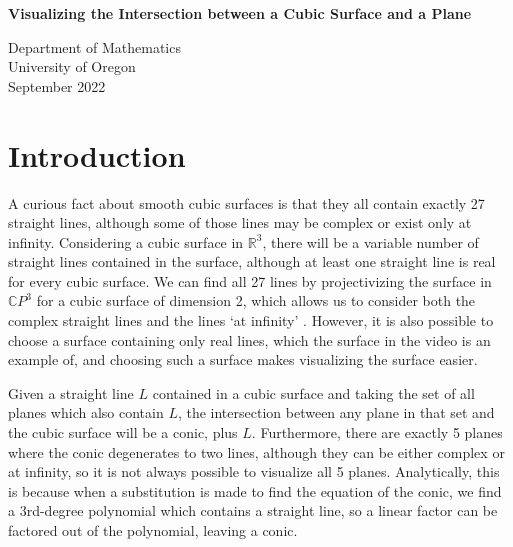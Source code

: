 \documentclass{article}
\newcommand{\C}{{\mathbb C}}
\newcommand{\R}{{\mathbb R}}
\begin{document}
\iftrue
\begin{titlepage}
    \begin{center}
        \vspace*{1cm}
            
        \Huge
        \textbf{Visualizing the Intersection between a Cubic Surface and a Plane}
            
        \vspace{0.5cm}
        \LARGE
            
        \vspace{1.5cm}
            
        
        \vspace{1.5cm}
        
        \large

            
        \vfill  
            
        \vspace{0.8cm}
            
        \Large
        Department of Mathematics\\
        University of Oregon\\
        September 2022
            
    \end{center}
\end{titlepage}
\fi

\section*{Introduction}
   
	
	A curious fact about smooth cubic surfaces is that they all contain exactly 27 straight lines, although some of those lines may be complex or exist only at infinity. Considering a cubic surface in $\R^3$, there will be a variable number of straight lines contained in the surface, although at least one straight line is real for every cubic surface. We can find all 27 lines by projectivizing the surface in $\C P^3$ for a cubic surface of dimension 2, which allows us to consider both the complex straight lines and the lines `at infinity' \cite{lines}. However, it is also possible to choose a surface containing only real lines, which the surface in the video is an example of, and choosing such a surface makes visualizing the surface easier.
	
	Given a straight line $L$ contained in a cubic surface and taking the set of all planes which also contain $L$, the intersection between any plane in that set and the cubic surface will be a conic, plus $L$. Furthermore, there are exactly 5 planes where the conic degenerates to two lines, although they can be either complex or at infinity, so it is not always possible to visualize all 5 planes. Analytically, this is because when a substitution is made to find the equation of the conic, we find a 3rd-degree polynomial which contains a straight line, so a linear factor can be factored out of the polynomial, leaving a conic. 
\end{document}
